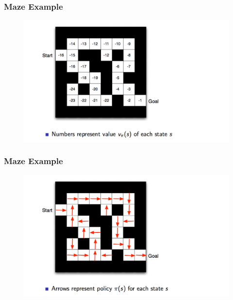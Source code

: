 \documentclass{beamer}
\begin{document}
\begin{frame}
\frametitle{Maze Example}
\begin{figure}[t]
\includegraphics[scale=0.3]{Maze3}
\centering
\end{figure}
\end{frame}


\begin{frame}
\frametitle{Maze Example}
\begin{figure}[t]
\includegraphics[scale=0.3]{Maze2}
\centering
\end{figure}
\end{frame}





%
%

\end{document}
